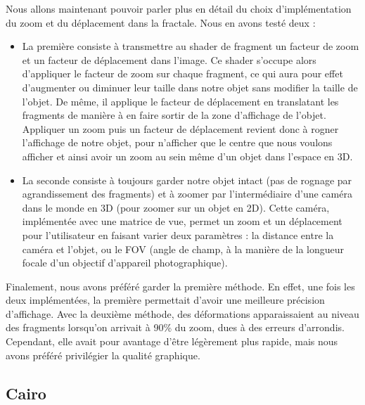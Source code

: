 \documentclass[11pt]{article}
\begin{document}
Nous allons maintenant pouvoir parler plus en détail du choix d'implémentation
du zoom et du déplacement dans la fractale. Nous en avons testé deux :
\begin{itemize}
    \item La première consiste à transmettre au shader de fragment un facteur de
        zoom et un facteur de déplacement dans l'image. Ce shader s'occupe alors
        d'appliquer le facteur de zoom sur chaque fragment, ce qui aura pour
        effet d'augmenter ou diminuer leur taille dans notre objet sans modifier
        la taille de l'objet. De même, il applique le facteur de déplacement en
        translatant les fragments de manière à en faire sortir de la zone
        d'affichage de l'objet. Appliquer un zoom puis un facteur de déplacement
        revient donc à rogner l'affichage de notre objet, pour n'afficher que le
        centre que nous voulons afficher et ainsi avoir un zoom au sein même
        d'un objet dans l'espace en 3D.
    \item La seconde consiste à toujours garder notre objet intact (pas de
        rognage par agrandissement des fragments) et à zoomer par
        l'intermédiaire d'une caméra dans le monde en 3D (pour zoomer sur un
        objet en 2D). Cette caméra, implémentée avec une matrice de vue, permet
        un zoom et un déplacement pour l'utilisateur en faisant varier deux
        paramètres : la distance entre la caméra et l'objet, ou le FOV (angle de
        champ, à la manière de la longueur focale d'un objectif d'appareil
        photographique).
\end{itemize}
Finalement, nous avons préféré garder la première méthode. En effet, une fois
les deux implémentées, la première permettait d'avoir une meilleure précision
d'affichage. Avec la deuxième méthode, des déformations apparaissaient au niveau
des fragments lorsqu'on arrivait à 90\% du zoom, dues à des erreurs d'arrondis.
Cependant, elle avait pour avantage d'être légèrement plus rapide, mais nous
avons préféré privilégier la qualité graphique.

\subsection{Cairo}
\end{document}
